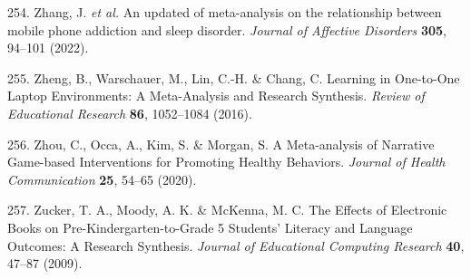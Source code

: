 \documentclass[
  english,
  man]{apa6}
\newenvironment{cslreferences}%
  {}%
  {\par}
\begin{document}
\begin{cslreferences}
\leavevmode\hypertarget{ref-zhangUpdatedMetaanalysisRelationship2022}{}%
254. Zhang, J. \emph{et al.} An updated of meta-analysis on the relationship between mobile phone addiction and sleep disorder. \emph{Journal of Affective Disorders} \textbf{305}, 94--101 (2022).

\leavevmode\hypertarget{ref-zhengLearningOnetoOneLaptop2016}{}%
255. Zheng, B., Warschauer, M., Lin, C.-H. \& Chang, C. Learning in One-to-One Laptop Environments: A Meta-Analysis and Research Synthesis. \emph{Review of Educational Research} \textbf{86}, 1052--1084 (2016).

\leavevmode\hypertarget{ref-zhouMetaanalysisNarrativeGamebased2020}{}%
256. Zhou, C., Occa, A., Kim, S. \& Morgan, S. A Meta-analysis of Narrative Game-based Interventions for Promoting Healthy Behaviors. \emph{Journal of Health Communication} \textbf{25}, 54--65 (2020).

\leavevmode\hypertarget{ref-zuckerEffectsElectronicBooks2009}{}%
257. Zucker, T. A., Moody, A. K. \& McKenna, M. C. The Effects of Electronic Books on Pre-Kindergarten-to-Grade 5 Students' Literacy and Language Outcomes: A Research Synthesis. \emph{Journal of Educational Computing Research} \textbf{40}, 47--87 (2009).
\end{cslreferences}

\newpage
\end{document}
